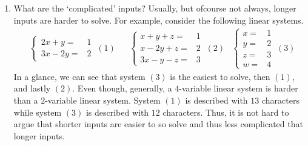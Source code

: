\begin{enumerate}
    \item What are the `complicated' inputs? Usually, but ofcourse not always, longer inputs are harder to solve. For example, consider the following linear systems. 
    \begin{align*}
        &\begin{cases}
          2x + y =& 1\\
          3x - 2y =& 2  
        \end{cases}\ (1) & 
        &\begin{cases}
            x + y + z =& 1\\
            x - 2y + z =&  2\\
            3x - y - z =&  3
          \end{cases}\ (2)
        &\begin{cases}
            x  =& 1\\
            y =&  2\\
            z =&  3 \\
            w =& 4
          \end{cases}\ (3)
    \end{align*}
    In a glance, we can see that system \((3)\) is the easiest to solve, then \((1)\), and lastly \((2)\). Even though, generally, a \(4\)-variable linear system is harder than a \(2\)-variable linear system. System \((1)\) is described with \(13\) characters while system \((3)\) is described with \(12\) characters. Thus, it is not hard to argue that shorter inputs are easier to so solve and thus less complicated that longer inputs. 


\end{enumerate}
